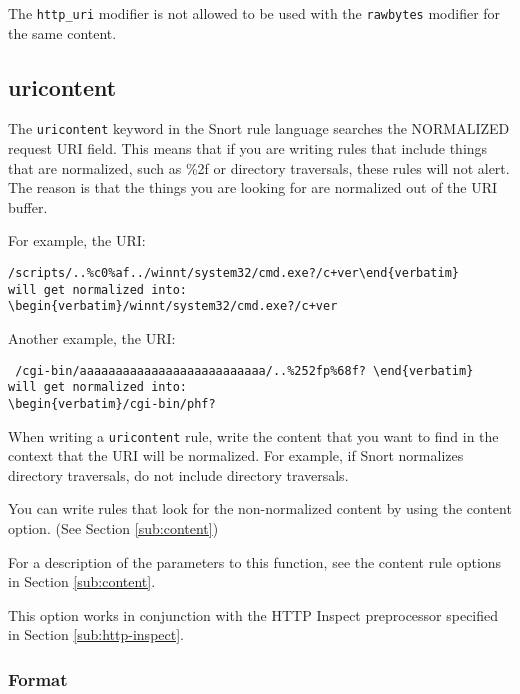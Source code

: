 \documentclass[english]{report}
\newenvironment{note}{
\samepage
    \vspace{10pt}{\textsf{
        {\hspace{7pt}\Huge{$\triangle$\hspace{-12.5pt}{\Large{$^!$}}}}\hspace{5pt}
        {\Large{NOTE}}
    }
    }
   \begin{center}
    \par\vspace{-17pt}

    \begin{lrbox}{\savepar}
    \begin{minipage}[r]{6in}
}
{
    \end{minipage}
    \end{lrbox}
    \fbox{
        \usebox{
            \savepar
	}
    }
    \par\vskip10pt
    \end{center}
}
\newenvironment{note}{
        \begin{rawhtml}
        <p><table border="1"><tr><td><b>
        Note:&nbsp;&nbsp;</b>
        \end{rawhtml}
}{
        \begin{rawhtml}
        </b></td></tr></table></p>
        \end{rawhtml}
}
\begin{document}
\begin{note}
The \texttt{http\_uri} modifier is not allowed to be used with
the \texttt{rawbytes} modifier for the same content.
\end{note}

\subsection{uricontent\label{sub:UriContent}}

The \texttt{uricontent} keyword in the Snort rule language searches the
NORMALIZED request \textsc{URI} field.  This means that if you are writing
rules that include things that are normalized, such as \%2f or directory
traversals, these rules will not alert.  The reason is that the things you
are looking for are normalized out of the URI buffer.  

For example, the URI: 
\begin{verbatim}/scripts/..%c0%af../winnt/system32/cmd.exe?/c+ver\end{verbatim}
will get normalized into:
\begin{verbatim}/winnt/system32/cmd.exe?/c+ver\end{verbatim}

Another example, the URI:
\begin{verbatim} /cgi-bin/aaaaaaaaaaaaaaaaaaaaaaaaaa/..%252fp%68f? \end{verbatim}
will get normalized into:
\begin{verbatim}/cgi-bin/phf?\end{verbatim}

When writing a \texttt{uricontent} rule, write the content that you want to
find in the context that the URI will be normalized.  For example, if Snort
normalizes directory traversals, do not include directory traversals.  

You can write rules that look for the non-normalized content by using the
content option.  (See Section \ref{sub:content})

For a description of the parameters to this function, see the content rule
options in Section \ref{sub:content}. 

This option works in conjunction with the HTTP Inspect preprocessor specified
in Section \ref{sub:http-inspect}.

\subsubsection{Format}
\end{document}
